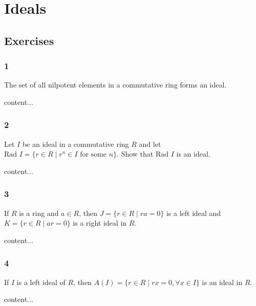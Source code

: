 \section{Ideals}
\subsection{Exercises}

\subsubsection*{1}
\begin{graybox}
	The set of all nilpotent elements in a commutative ring forms an ideal.
\end{graybox}
\begin{solution}
	content...
\end{solution}

\subsubsection*{2}
\begin{graybox}
	Let $I$ be an ideal in a commutative ring $R$ and let $\text{Rad } I = \{r \in R \mid r^n \in I \text{ for some } n\}$. Show that $\text{Rad } I$ is an ideal.
\end{graybox}
\begin{solution}
	content...
\end{solution}

\subsubsection*{3}
\begin{graybox}
	If $R$ is a ring and $a \in R$, then $J = \{r \in R \mid ra = 0\}$ is a left ideal and $K = \{r \in R \mid ar = 0\}$ is a right ideal in $R$.
\end{graybox}
\begin{solution}
	content...
\end{solution}

\subsubsection*{4}
\begin{graybox}
	If $I$ is a left ideal of $R$, then $A(I) = \{r \in R \mid rx = 0, \forall x \in I\}$ is an ideal in $R$.
\end{graybox}
\begin{solution}
	content...
\end{solution}

